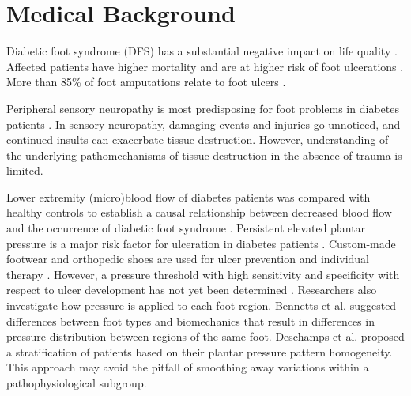 \documentclass[
  oneside]{book}
\begin{document}
\hypertarget{diabfoot-intro}{%
\section{Medical Background}\label{diabfoot-intro}}

Diabetic foot syndrome (DFS) has a substantial negative impact on life quality \autocite{RN1}.
Affected patients have higher mortality \autocite{RN1,moulik2003amputationmortality} and are at higher risk of foot ulcerations \autocite{SinghEtAl:PreventingFootUlcers2005}.
More than 85\% of foot amputations relate to foot ulcers \autocite{RN3,RN4}.

Peripheral sensory neuropathy is most predisposing for foot problems in diabetes patients \autocite{RN7}.
In sensory neuropathy, damaging events and injuries go unnoticed, and continued insults can exacerbate tissue destruction.
However, understanding of the underlying pathomechanisms of tissue destruction in the absence of trauma is limited.

Lower extremity (micro)blood flow of diabetes patients was compared with healthy controls to establish a causal relationship between decreased blood flow and the occurrence of diabetic foot syndrome \autocite{RN11,RN12,RN13,RN14,RN15,RN16}.
Persistent elevated plantar pressure is a major risk factor for ulceration in diabetes patients \autocite{VevesEtAl:Diabetologia1992,ArmstrongEtAl:CriticalLevelOfPlantarPressure1998,LaveryEtAl:DiabetesCare2003}.
Custom-made footwear and orthopedic shoes are used for ulcer prevention and individual therapy \autocite{Frykberg:DiabeticFootGuideline2006,CavanaghEtAl:OffLoading2010,Rizzo:DiabeticFootwear2012}.
However, a pressure threshold with high sensitivity and specificity with respect to ulcer development has not yet been determined \autocite{Waldecker:FootAnkleSurgery2012,fernando2018importance}.
Researchers also investigate how pressure is applied to each foot region.
Bennetts et al. \autocite{BennettsEtAl:Biomechanics2013} suggested differences between foot types and biomechanics that result in differences in pressure distribution between regions of the same foot.
Deschamps et al. \autocite{DeschampsEtAL:KMeansDiabeticFoot2013} proposed a stratification of patients based on their plantar pressure pattern homogeneity. This approach may avoid the pitfall of smoothing away variations within a pathophysiological subgroup.
\end{document}
